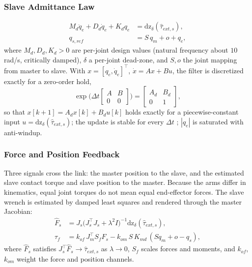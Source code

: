 \documentclass[a4paper, 10pt, conference]{ieeeconf}      %
\begin{document}
\subsubsection{Slave Admittance Law}
\begin{equation}
\begin{aligned}
M_d\ddot q_e+D_d\dot q_e+K_dq_e&=\mathrm{dz}_{\delta}(\hat\tau_{ext,s}),\\
q_{s,ref}&=S\,q_m+o+q_e,
\end{aligned}
\label{eq:admittance}
\end{equation}
where $M_d,D_d,K_d>0$ are per-joint design values (natural frequency about $10$\,rad/s, critically damped), $\delta$ a per-joint dead-zone, and $S,o$ the joint mapping from master to slave. With $x=[q_e,\dot q_e]^{\top}$, $\dot x=Ax+Bu$, the filter is discretized exactly for a zero-order hold,
\begin{equation}
\exp\!\Big(\Delta t\begin{bmatrix}A&B\\0&0\end{bmatrix}\Big)=\begin{bmatrix}A_d&B_d\\0&1\end{bmatrix},
\end{equation}
so that $x[k+1]=A_dx[k]+B_du[k]$ holds exactly for a piecewise-constant input $u=\mathrm{dz}_{\delta}(\hat\tau_{ext,s})$; the update is stable for every $\Delta t$ \cite{vanloan1978}; $|q_e|$ is saturated with anti-windup.

\subsubsection{Force and Position Feedback}
Three signals cross the link: the master position to the slave, and the estimated slave contact torque and slave position to the master. Because the arms differ in kinematics, equal joint torques do not mean equal end-effector forces. The slave wrench is estimated by damped least squares and rendered through the master Jacobian:
\begin{equation}
\begin{aligned}
\hat F_s&=J_s\big(J_s^{\top}J_s+\lambda^2I\big)^{-1}\mathrm{dz}_{\delta}(\hat\tau_{ext,s}),\\
\tau_f&=k_{of}\,J_m^{\top}S_f\hat F_s-k_{om}\,S\,K_{md}\,(S q_m+o-q_s),
\end{aligned}
\label{eq:feedback}
\end{equation}
where $\hat F_s$ satisfies $J_s^{\top}\hat F_s\to\hat\tau_{ext,s}$ as $\lambda\to0$, $S_f$ scales forces and moments, and $k_{of}$, $k_{om}$ weight the force and position channels.
\end{document}
